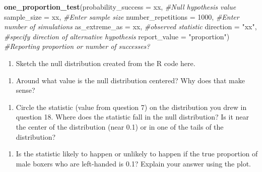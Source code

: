 \documentclass[
]{report}
\newenvironment{Shaded}{\begin{snugshade}}{\end{snugshade}}
\newcommand{\CommentTok}[1]{\textcolor[rgb]{0.56,0.35,0.01}{\textit{#1}}}
\newcommand{\DataTypeTok}[1]{\textcolor[rgb]{0.13,0.29,0.53}{#1}}
\newcommand{\DecValTok}[1]{\textcolor[rgb]{0.00,0.00,0.81}{#1}}
\newcommand{\KeywordTok}[1]{\textcolor[rgb]{0.13,0.29,0.53}{\textbf{#1}}}
\newcommand{\NormalTok}[1]{#1}
\newcommand{\StringTok}[1]{\textcolor[rgb]{0.31,0.60,0.02}{#1}}
\providecommand{\tightlist}{%
  \setlength{\itemsep}{0pt}\setlength{\parskip}{0pt}}
\begin{document}
\begin{Shaded}
\begin{Highlighting}[]
\KeywordTok{one\_proportion\_test}\NormalTok{(}\DataTypeTok{probability\_success =}\NormalTok{ xx, }\CommentTok{\#Null hypothesis value}
                    \DataTypeTok{sample\_size =}\NormalTok{ xx, }\CommentTok{\#Enter sample size}
                    \DataTypeTok{number\_repetitions =} \DecValTok{1000}\NormalTok{, }\CommentTok{\#Enter number of simulations}
                    \DataTypeTok{as\_extreme\_as =}\NormalTok{ xx, }\CommentTok{\#observed statistic}
                    \DataTypeTok{direction =} \StringTok{"xx"}\NormalTok{, }\CommentTok{\#specify direction of alternative hypothesis}
                    \DataTypeTok{report\_value =} \StringTok{"proportion"}\NormalTok{) }\CommentTok{\#Reporting proportion or number of successes?}
\end{Highlighting}
\end{Shaded}

\begin{enumerate}
\def\labelenumi{\arabic{enumi}.}
\setcounter{enumi}{17}
\tightlist
\item
  Sketch the null distribution created from the R code here.
\end{enumerate}

\vspace{1.8in}

\begin{enumerate}
\def\labelenumi{\arabic{enumi}.}
\setcounter{enumi}{18}
\tightlist
\item
  Around what value is the null distribution centered? Why does that make sense?
\end{enumerate}

\vspace{1in}

\begin{enumerate}
\def\labelenumi{\arabic{enumi}.}
\setcounter{enumi}{19}
\tightlist
\item
  Circle the statistic (value from question 7) on the distribution you drew in question 18. Where does the statistic fall in the null distribution? Is it near the center of the distribution (near 0.1) or in one of the tails of the distribution?
\end{enumerate}

\vspace{1in}

\begin{enumerate}
\def\labelenumi{\arabic{enumi}.}
\setcounter{enumi}{20}
\tightlist
\item
  Is the statistic likely to happen or unlikely to happen if the true proportion of male boxers who are left-handed is 0.1? Explain your answer using the plot.
\end{enumerate}
\end{document}
